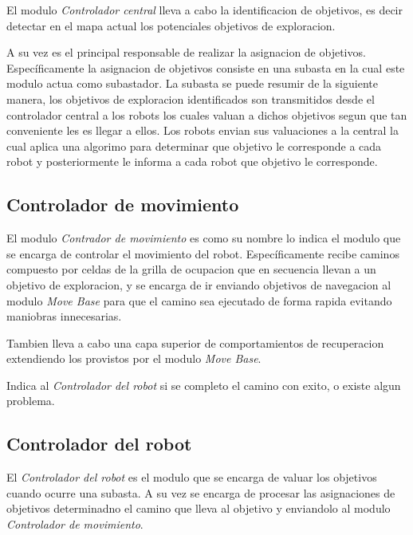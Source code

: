 El modulo \emph{Controlador central} lleva a cabo la identificacion de objetivos, es decir detectar en
el mapa actual los potenciales objetivos de exploracion. 

A su vez es el principal responsable de realizar la asignacion de objetivos.
Específicamente la asignacion de objetivos consiste en una subasta en la cual
este modulo actua como subastador. La subasta se puede resumir de la siguiente
manera, los objetivos de exploracion identificados son transmitidos desde el
controlador central a los robots los cuales valuan a dichos objetivos segun que
tan conveniente les es llegar a ellos. Los robots envian sus valuaciones a la
central la cual aplica una algorimo para determinar que objetivo le corresponde
a cada robot y posteriormente le informa a cada robot que objetivo le
corresponde.




\subsection{Controlador de movimiento}
El modulo \emph{Contrador de movimiento} es como su nombre lo indica el modulo
que se encarga de controlar el movimiento del robot. Específicamente recibe
caminos compuesto por celdas de la grilla de ocupacion que en secuencia llevan
a un objetivo de exploracion, y se encarga de ir enviando objetivos de
navegacion al modulo \emph{Move Base} para que el camino sea ejecutado de forma
rapida evitando maniobras innecesarias.

Tambien lleva a cabo una capa superior de comportamientos de recuperacion
extendiendo los provistos por el modulo \emph{Move Base}.

Indica al \emph{Controlador del robot} si se completo el camino con exito, o
existe algun problema.

\subsection{Controlador del robot}
El \emph{Controlador del robot} es el modulo que se encarga de valuar los
objetivos cuando ocurre una subasta. A su vez se encarga de procesar las
asignaciones de objetivos determinadno el camino que lleva al objetivo y
enviandolo al modulo \emph{Controlador de movimiento}. 


